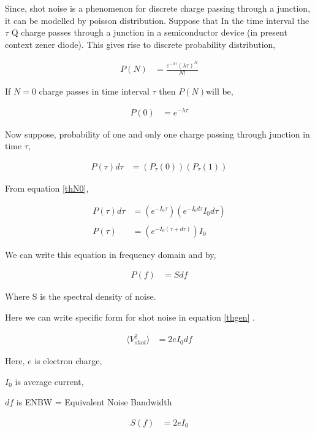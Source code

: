 \documentclass[draft,12pt]{article}
\begin{document}
Since, shot noise is a phenomenon for discrete charge passing through a junction, it can be modelled by poisson distribution. Suppose that In the time interval the $\tau$ Q charge passes through a junction in a semiconductor device (in present context zener diode). This gives rise to discrete probability distribution,

\begin{align}
P(N) & = \frac{e^{-\lambda \tau}(\lambda \tau)^{N}}{N!}
\end{align}

If $N=0$ charge passes in time interval $\tau$ then $P(N)$will be,

\begin{align} \label{eqN0}
P(0) & = e^{-\lambda \tau}
\end{align}

Now suppose, probability of one and only one charge passing through junction in time $\tau$,

\begin{align*}
P(\tau)d\tau & = (P_{\tau}(0))(P_{\tau}(1))
\end{align*}

From equation \ref{thN0},


\begin{align*}
P(\tau)d\tau & = (e^{-I_0 \tau})(e^{-I_0 d\tau} I_0 d\tau)\\
\\  
P(\tau) & = (e^{-I_0 (\tau + d\tau)}) I_0
\end{align*}

We can write this equation in frequency domain and by,

\begin{align}\label{thgenl}
P(f) & = S df
\end{align}

Where S is the spectral density of noise.

Here we can write specific form for shot noise in equation \ref{thgen} \cite{campbell}.

\begin{align}\label{thshotvo}
\langle V_{shot}^2\rangle & = 2 e I_0 df
\end{align}

Here, $e$ is electron charge,

$I_0$ is average current,

$df$ is ENBW = Equivalent Noise Bandwidth

\begin{align}\label{thshots}
S(f) & = 2 e I_0
\end{align}
\end{document}
